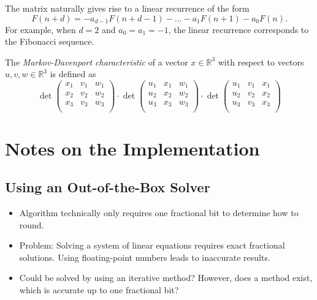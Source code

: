 \documentclass[english,version-2020-11]{uzl-thesis}
\begin{document}
The matrix naturally gives rise to a linear recurrence of the form
\[
  F(n + d) = -a_{d-1} F(n + d - 1) - \dots - a_1 F(n + 1) - a_0 F(n).
\]
For example, when $d = 2$ and $a_0 = a_1 = -1$, the linear recurrence
corresponds to the Fibonacci sequence.

\begin{definition}
  The \emph{Markov-Davenport characteristic} of a vector $x ∈ ℝ^3$ with respect to vectors $u, v, w ∈ ℝ^3$
  is defined as
  \[
    \det
    \begin{pmatrix}
      x_1 & v_1 & w_1 \\
      x_2 & v_2 & w_2 \\
      x_3 & v_3 & w_3 \\
    \end{pmatrix}
    · \det
    \begin{pmatrix}
      u_1 & x_1 & w_1 \\
      u_2 & x_2 & w_2 \\
      u_3 & x_3 & w_3 \\
    \end{pmatrix}
    · \det
    \begin{pmatrix}
      u_1 & v_1 & x_1 \\
      u_2 & v_2 & x_2 \\
      u_3 & v_3 & x_3 \\
    \end{pmatrix}
  \]
\end{definition}


\chapter{Notes on the Implementation}


\section{Using an Out-of-the-Box Solver}

\begin{itemize}
  \item Algorithm technically only requires one fractional bit to determine how to round.
  \item Problem: Solving a system of linear equations requires exact fractional solutions.
    Using floating-point numbers leads to inaccurate results.
  \item Could be solved by using an iterative method? However, does a method
    exist, which is accurate up to one fractional bit?
\end{itemize}
\end{document}
